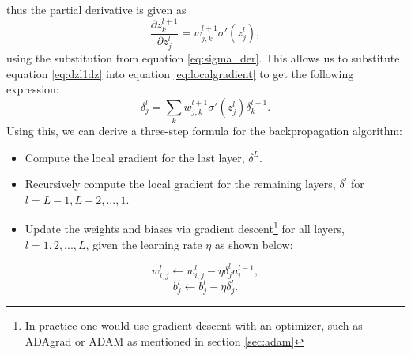 thus the partial derivative is given as 
\begin{equation}
    \label{eq:dzl1dz}
    \frac{\partial z_k^{l+1}}{\partial z_j^l} = w_{j,k}^{l+1}\sigma'(z_j^l), 
\end{equation}
using the substitution from equation \ref{eq:sigma_der}. This allows us to substitute equation \ref{eq:dzl1dz} into equation \ref{eq:localgradient} to get the following expression:
\begin{equation}
    \label{eq:localgradient2}
    \delta_j^l = \sum_k w_{j,k}^{l+1}\sigma'(z_j^l)\delta_k^{l+1}.
\end{equation}
Using this, we can derive a three-step formula for the backpropagation algorithm:
\begin{itemize}
    \item Compute the local gradient for the last layer, $\delta^L$.
    \item Recursively compute the local gradient for the remaining layers, $\delta^l$ for $l=L-1, L-2, ..., 1$.
    \item Update the weights and biases via gradient descent\footnote{In practice one would use gradient descent with an optimizer, such as ADAgrad or ADAM as mentioned in section \ref{sec:adam}} for all layers, $l=1, 2, ..., L$, given the learning rate $\eta$ as shown below: 
\end{itemize}
\begin{equation*}
    w_{i,j}^{l} \leftarrow w_{i,j}^{l} - \eta \delta_j^l a_i^{l-1},
\end{equation*}
\begin{equation*}
    b_j^l \leftarrow b_j^l - \eta \delta_j^l.
\end{equation*}
